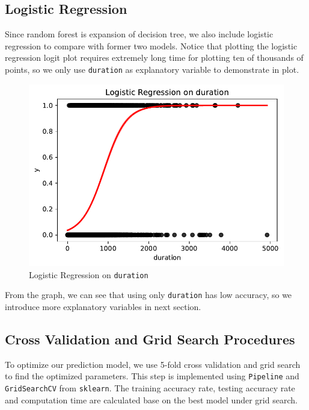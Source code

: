 \documentclass[11pt,a4paper]{article}
\begin{document}
    \subsection{Logistic Regression} \label{logistic_regression}
    Since random forest is expansion of decision tree, we also include logistic regression to compare with former two models. Notice that plotting the logistic regression logit plot requires extremely long time for plotting ten of thousands of points, so we only use \texttt{duration} as explanatory variable to demonstrate in plot.
    \begin{figure}[!ht]
        \centering
        \includegraphics{plot/classification/lr/lr_duration.pdf}
        \caption{Logistic Regression on \texttt{duration}}
        \label{fig:lr}
    \end{figure}
    
    \noindent
    From the graph, we can see that using only \texttt{duration} has low accuracy, so we introduce more explanatory variables in next section.
    
    
    
    \subsection{Cross Validation and Grid Search Procedures}
    To optimize our prediction model, we use 5-fold cross validation and grid search to find the optimized parameters. This step is implemented using \texttt{Pipeline} and \texttt{GridSearchCV} from \texttt{sklearn}. The training accuracy rate, testing accuracy rate and computation time are calculated base on the best model under grid search. \\
    
\end{document}
